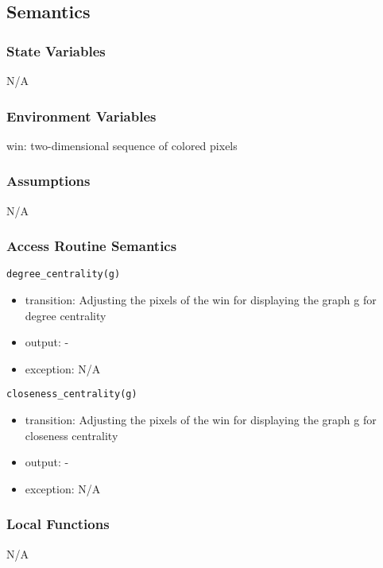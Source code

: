 \documentclass[12pt, titlepage]{article}
\begin{document}
\subsection{Semantics}

\subsubsection{State Variables}

N/A

\subsubsection{Environment Variables}

win: two-dimensional sequence of colored pixels

\subsubsection{Assumptions}

N/A

\subsubsection{Access Routine Semantics}

\noindent \texttt{degree\_centrality(g)}
\begin{itemize}
\item transition: Adjusting the pixels of the win for displaying the graph g for degree centrality
\item output: -
\item exception: N/A  
\end{itemize}

\noindent \texttt{closeness\_centrality(g)}
\begin{itemize}
\item transition: Adjusting the pixels of the win for displaying the graph g for closeness centrality
\item output: -
\item exception: N/A  
\end{itemize}

\subsubsection{Local Functions}

N/A

\newpage
\end{document}
